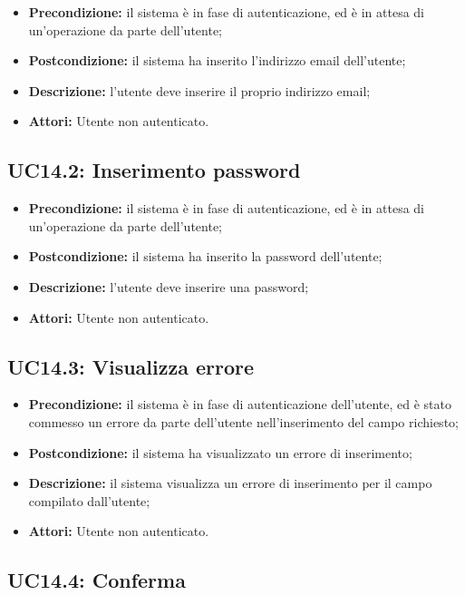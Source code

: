 \begin{itemize}
	\item \textbf{Precondizione:} il sistema è in fase di autenticazione, ed è in attesa di un'operazione da parte dell'utente;
	\item \textbf{Postcondizione:} il sistema ha inserito l'indirizzo email dell'utente;
	\item \textbf{Descrizione:} l'utente deve inserire il proprio indirizzo email;
	\item \textbf{Attori:} Utente non autenticato.
\end{itemize}
\subsection{ UC14.2: Inserimento password}

\begin{itemize}
	\item \textbf{Precondizione:} il sistema è in fase di autenticazione, ed è in attesa di un'operazione da parte dell'utente;
	\item \textbf{Postcondizione:} il sistema ha inserito la password dell'utente;
	\item \textbf{Descrizione:} l'utente deve inserire una password;
	\item \textbf{Attori:} Utente non autenticato.
\end{itemize}
\subsection{ UC14.3: Visualizza errore}

\begin{itemize}
	\item \textbf{Precondizione:} il sistema è in fase di autenticazione dell'utente, ed è stato commesso un errore da parte dell'utente nell'inserimento del campo richiesto;
	\item \textbf{Postcondizione:} il sistema ha visualizzato un errore di inserimento;
	\item \textbf{Descrizione:} il sistema visualizza un errore di inserimento per il campo compilato dall'utente;
	\item \textbf{Attori:} Utente non autenticato.
\end{itemize}
\subsection{ UC14.4: Conferma}

